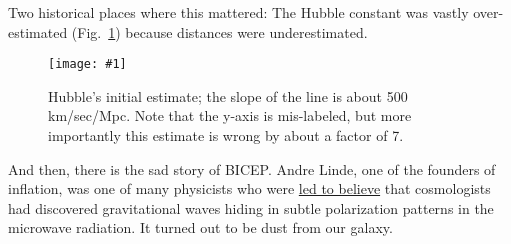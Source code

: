 \documentclass[prd,amsmath,aps,floats,amssymb, floatfix,
  superscriptaddress,nofootinbib]{revtex4-1}
\newcommand{\sfig}[2]{
\texttt{[image: \#1]}
        }
\newcommand{\Sjpg}[2]{
    \begin{figure}[thbp]
    \sfig{Figures/#1.jpg}{0.65\columnwidth}
    \caption{{\small #2}}
    \label{fig:#1}
    \end{figure}
}
\newcommand{\rf}[1]{\ref{fig:#1}}
\newcommand{\ec}[1]{Eq.~(\ref{eq:#1})}
\newcommand{\eql}[1]{\label{eq:#1}}
\def\vs{\nonumber\\}
\numberwithin{equation}{section}
\newcommand\be{\begin{equation}}
\newcommand\ee{\end{equation}}
\def\bea{\begin{eqnarray}}
\def\eea{\end{eqnarray}}
\begin{document}
%
%

%
%
%
%
% 
 Two historical places where this mattered:
 The Hubble constant was vastly over-estimated (Fig.~\rf{hubble}) because distances were underestimated.
 \Sjpg{hubble}{Hubble's initial estimate; the slope of the line is about 500 km/sec/Mpc. Note that the y-axis is mis-labeled, but more importantly this estimate is wrong by about a factor of 7.}
 And then, there is the sad story of BICEP. Andre Linde, one of the founders of inflation, was one of many physicists who were  \href{https://www.youtube.com/watch?v=ZlfIVEy_YOA}{led to believe} that cosmologists had discovered gravitational waves hiding in subtle polarization patterns in the microwave radiation. It turned out to be dust from our galaxy.
 
\end{document}
